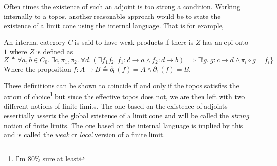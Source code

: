 Often times the existence of such an adjoint is too strong a
condition. Working internally to a topos, another reasonable approach
would be to state the existence of a limit cone using the internal
language. That is for example,
\begin{defn}\label{defn:completeness:weakproducts}
  An internal category $C$ is said to have weak products if there is
  $Z$ has an epi onto $1$ where $Z$ is defined as
  \[
    Z \triangleq \forall a, b \in C_0.\ \exists c, \pi_1, \pi_2.
    \ \forall d.\ (\exists f_1 f_2.\ f_1 : d \to a \mathrel{\wedge} f_2 : d \to b) \implies
    \exists! g.\ g : c \to d \mathrel{\wedge} \pi_i \circ g = f_i\}
  \]
  Where the proposition
  $f : A \to B \triangleq \partial_0(f) = A \mathrel{\wedge} \partial_1(f) = B$.
\end{defn}
These definitions can be shown to coincide if and only if the topos
satisfies the axiom of choice\footnote{I'm 80\% sure at least} but
since the effective topos does not, we are then left with two
different notions of finite limits. The one based on the existence of
adjoints essentially asserts the global existence of a limit cone and
will be called the \emph{strong} notion of finite limits. The one
based on the internal language is implied by this and is called the
\emph{weak} or \emph{local} version of a finite limit.

